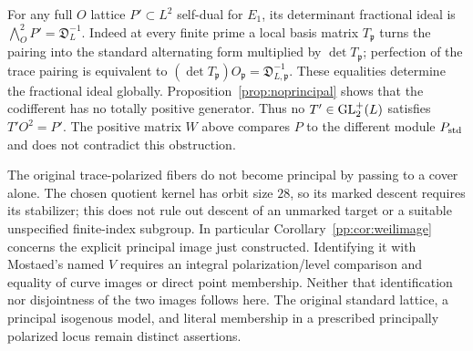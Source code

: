 \begin{remark}
\label{pp:rem:obstruction}
For any full $O$ lattice $P'\subset L^2$ self-dual for $E_1$, its
determinant fractional ideal is $\bigwedge_O^2P'=\mathfrak D_L^{-1}$.
Indeed at every finite prime a local basis matrix $T_{\mathfrak p}$
turns the pairing into the standard alternating form multiplied by
$\det T_{\mathfrak p}$; perfection of the trace pairing is equivalent
to $(\det T_{\mathfrak p})O_{\mathfrak p}
=\mathfrak D_{L,\mathfrak p}^{-1}$. These equalities determine the
fractional ideal globally. Proposition~\ref{prop:noprincipal} shows
that the codifferent has no totally positive generator. Thus no
$T'\in\operatorname{GL}_2^+(L)$ satisfies $T'O^2=P'$. The positive matrix $W$ above
compares $P$ to the different module $P_{\rm std}$ and does not contradict
this obstruction.

The original trace-polarized fibers do not become principal by passing
to a cover alone. The chosen quotient kernel has orbit size $28$, so its
marked descent requires its stabilizer; this does not rule out descent
of an unmarked target or a suitable unspecified finite-index subgroup.
In particular Corollary~\ref{pp:cor:weilimage} concerns the explicit
principal image just constructed. Identifying it with Mostaed's named
$V$ requires an integral polarization/level comparison and equality of
curve images or direct point membership. Neither that identification
nor disjointness of the two images follows here. The original
standard lattice, a principal isogenous model, and literal membership
in a prescribed principally polarized locus remain distinct assertions.
\end{remark}

